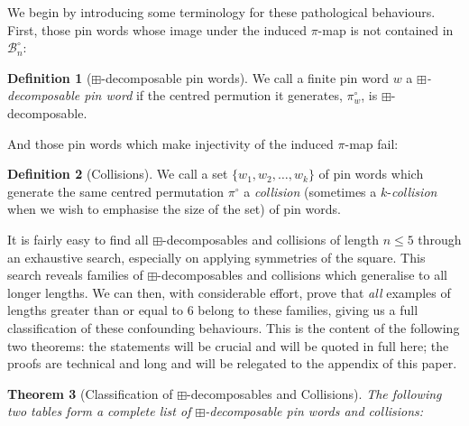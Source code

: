 \documentclass[11pt,a4paper]{article}
\newtheorem{thm}{Theorem}[section]
\theoremstyle{definition}
\newtheorem{defn}[thm]{Definition}
\begin{document}
We begin by introducing some terminology for these pathological behaviours. First, those pin words whose image under the induced $\pi$-map is not contained in $\mathcal{B}^{\circ}_{n}$:

\begin{defn}[$\boxplus$-decomposable pin words]
We call a finite pin word $w$ a \emph{$\boxplus$-decomposable pin word} if the centred permution it generates, $\pi^{\circ}_{w}$, is $\boxplus$-decomposable.
\end{defn}

And those pin words which make injectivity of the induced $\pi$-map fail:

\begin{defn}[Collisions]
We call a set $\{w_{1}, w_{2}, \dots , w_{k}\}$ of pin words which generate the same centred permutation $\pi^{\circ}$ a \emph{collision} (sometimes a $k$-\emph{collision} when we wish to emphasise the size of the set) of pin words.
\end{defn}

It is fairly easy to find all $\boxplus$-decomposables and collisions of length $n\leq5$ through an exhaustive search, especially on applying symmetries of the square. This search reveals families of $\boxplus$-decomposables and collisions which generalise to all longer lengths. We can then, with considerable effort, prove that \emph{all} examples of lengths greater than or equal to $6$ belong to these families, giving us a full classification of these confounding behaviours. This is the content of the following two theorems: the statements will be crucial and will be quoted in full here; the proofs are technical and long and will be relegated to the appendix of this paper.

\newpage

\begin{thm}[Classification of $\boxplus$-decomposables and Collisions] \label{classification}
The following two tables form a complete list of $\boxplus$-decomposable pin words and collisions:
\end{thm}
\end{document}
